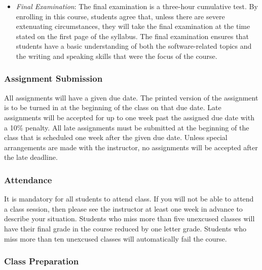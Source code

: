 \begin{itemize}
    \item {\em Final Examination}: The final examination is a three-hour cumulative test.  By enrolling in this course,
        students agree that, unless there are severe extenuating circumstances, they will take the final examination at
        the time stated on the first page of the syllabus.  The final examination ensures that students have a basic
        understanding of both the software-related topics and the writing and speaking skills that were the focus of the
        course.

\end{itemize}
\vspace*{-.2in}

\subsubsection*{Assignment Submission}

All assignments will have a given due date.  The printed version of the assignment is to be turned in at the beginning
of the class on that due date.  Late assignments will be accepted for up to one week past the assigned due date with a
10\% penalty.  All late assignments must be submitted at the beginning of the class that is scheduled one week after the
given due date.  Unless special arrangements are made with the instructor, no assignments will be accepted after the
late deadline.

\subsubsection*{Attendance}

It is mandatory for all students to attend class.  If you will not be able to attend a class session, then please see
the instructor at least one week in advance to describe your situation.  Students who miss more than five unexcused
classes will have their final grade in the course reduced by one letter grade.  Students who miss more than ten
unexcused classes will automatically fail the course.

\vspace*{-.2in}
\subsubsection*{Class Preparation}

%

